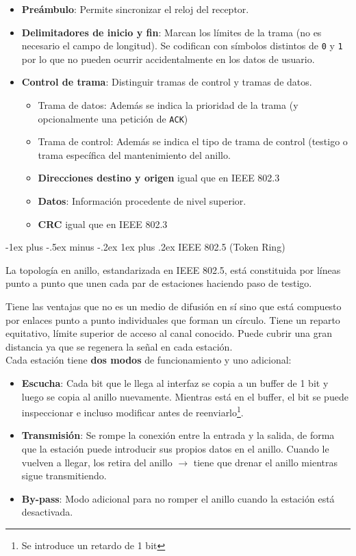 \documentclass[10pt,portrait, twocolumn]{article}
\makeatletter
\renewcommand{\subsubsection}{\@startsection{subsubsection}{3}{0mm}%
                                {-1ex plus -.5ex minus -.2ex}%
                                {1ex plus .2ex}%
                                {\normalfont\small\bfseries}}
\makeatother
\begin{document}
\begin{itemize}
	\item \textbf{Preámbulo}: Permite sincronizar el reloj del receptor.
	\item \textbf{Delimitadores de inicio y fin}: Marcan los límites de la trama (no es necesario el campo de longitud). Se codifican con símbolos distintos de \texttt{0} y \texttt{1} por lo que no pueden ocurrir accidentalmente en los datos de usuario.
	\item \textbf{Control de trama}: Distinguir tramas de control y tramas de datos.
		\begin{itemize}
		\item Trama de datos: Además se indica la prioridad de la trama (y opcionalmente una petición de \texttt{ACK})
		\item Trama de control: Además se indica el tipo de trama de control (testigo o trama específica del mantenimiento del anillo.
		\item \textbf{Direcciones destino y origen} igual que en IEEE 802.3
		\item \textbf{Datos}: Información procedente de nivel superior.
		\item \textbf{CRC} igual que en IEEE 802.3
		\end{itemize}
		
\end{itemize}

\subsubsection{IEEE 802.5 (Token Ring)}

La topología en anillo, estandarizada en IEEE 802.5, está constituida por líneas punto a punto que unen cada par de estaciones haciendo paso de testigo.

\quad Tiene las ventajas que no es un medio de difusión en sí sino que está compuesto por enlaces punto a punto individuales que forman un círculo. Tiene un reparto equitativo, límite superior de acceso al canal conocido. Puede cubrir una gran distancia ya que se regenera la señal en cada estación.\\


Cada estación tiene \textbf{dos modos} de funcionamiento y uno adicional:

	\begin{itemize}
		\item \textbf{Escucha}: Cada bit que le llega al interfaz se copia a un buffer de 1 bit y luego se copia al anillo nuevamente. Mientras está en el buffer, el bit se puede inspeccionar e incluso modificar antes de reenviarlo\footnote{Se introduce un retardo de 1 bit}.
		\item \textbf{Transmisión}: Se rompe la conexión entre la entrada y la salida, de forma que la estación puede introducir sus propios datos en el anillo. Cuando le vuelven a llegar, los retira del anillo $\rightarrow$ tiene que drenar el anillo mientras sigue transmitiendo.
		\item \textbf{By-pass}: Modo adicional para no romper el anillo cuando la estación está desactivada.
	\end{itemize}
	
\end{document}
